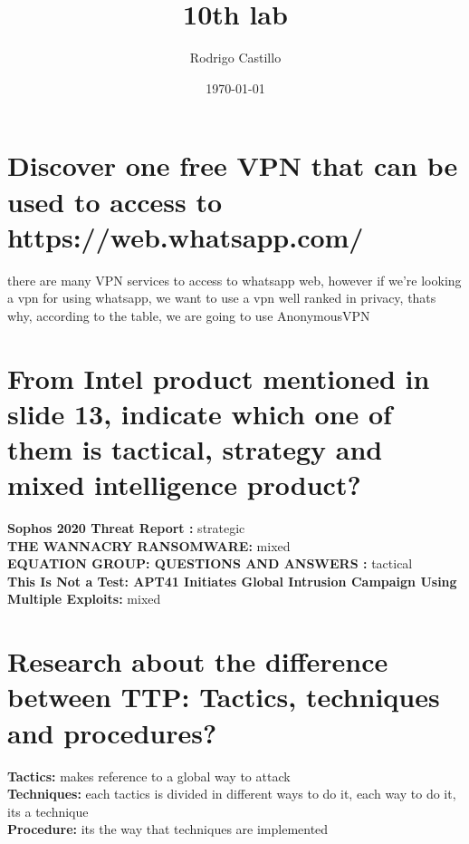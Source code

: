 \documentclass[10pt,a4paper]{article} %
\begin{document}
    \title{{  10th lab  }}
    \author{{Rodrigo Castillo}}
    \date{\today}

    \maketitle



    \section{Discover one free VPN that can be used to access to
    https://web.whatsapp.com/}
        there are many VPN services to access to whatsapp web, however if we're
        looking a vpn for using whatsapp, we want to use a vpn well ranked in
        privacy, thats why, according to the table, we are going to use
        AnonymousVPN

    \section{ From Intel product mentioned in slide 13, indicate which one of them is tactical,
        strategy and mixed intelligence product?}
        \textbf{Sophos 2020 Threat Report :}  strategic
        \\

        \textbf{THE WANNACRY RANSOMWARE:} mixed
        \\

        \textbf{EQUATION GROUP: QUESTIONS AND ANSWERS :} tactical
        \\

        \textbf{This Is Not a Test: APT41 Initiates Global Intrusion Campaign
        Using Multiple Exploits:} mixed




    \section{Research about the difference between TTP: Tactics, techniques and
    procedures?}

        \textbf{Tactics:}  makes reference to a global way to attack
        \\
        \textbf{Techniques:}  each tactics is divided in different ways to do it,
            each way to do it, its a technique
            \\
        \textbf{Procedure:}  its the way that techniques are implemented
\end{document}
